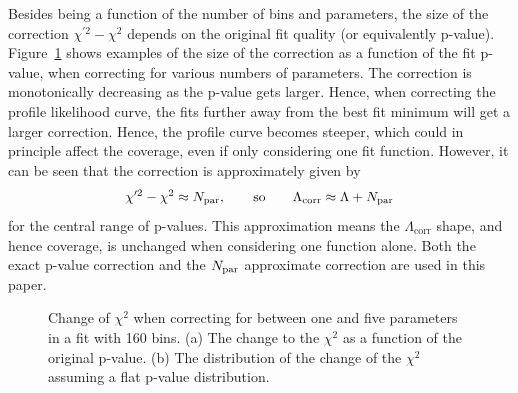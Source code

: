 \begin{enumerate}
Besides being a function of the number of bins and parameters,
the size of the correction $\chi^{\prime 2} - \chi^2$
depends on the original fit quality
(or equivalently p-value). Figure~\ref{fig:correction:DeltaChiSq}
shows examples of the size of the correction as a function of the
fit p-value, when correcting for various numbers of parameters.
The correction is monotonically decreasing as the p-value gets larger.
Hence, when correcting the profile likelihood curve, the fits further away from
the best fit minimum will get a larger correction. Hence, the profile curve
becomes steeper, which could in principle affect the coverage, even if
only considering one fit function.
However, it can be seen that the correction is approximately given by
\begin{displaymath}
\chi^{\prime 2} - \chi^2 \approx N_{\rm par},
\qquad{\rm so}\qquad
\Lambda_{\mathrm{corr}} \approx \textrm{\ensuremath{\Lambda}} + N_{\rm par}
\end{displaymath}
for the central range of p-values. This approximation means the
$\Lambda_{\mathrm{corr}}$ shape, and hence coverage, is unchanged when considering one function alone. Both the
exact p-value
correction and the $N_{\rm par}$ approximate correction are used in this paper.
%
\begin{figure}[tbp]
\centering
\caption{Change of $\chi^2$ when correcting for between one and five parameters
in a fit with 160 bins. (a) The change to the $\chi^2$ as a function of the
original p-value. (b) The distribution of the change of
the $\chi^2$ assuming a flat p-value distribution.}
\label{fig:correction:DeltaChiSq}
\end{figure}



\end{enumerate}
